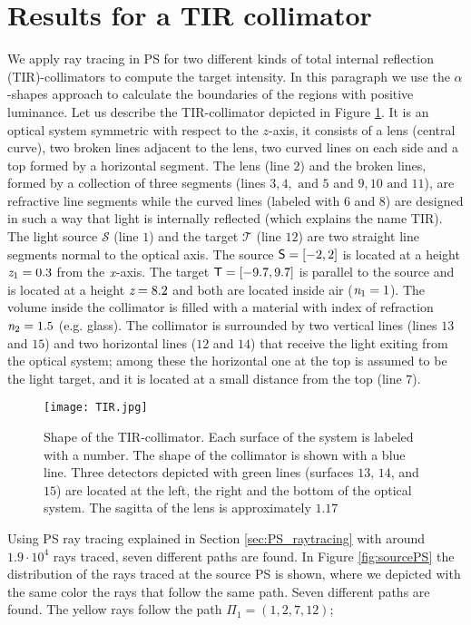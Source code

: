 \section{Results for a TIR collimator}
We apply ray tracing in PS for two different kinds of total internal reflection (TIR)-collimators to compute the target intensity. 
In this paragraph we use the $\alpha$-shapes approach to calculate the boundaries of the regions with positive luminance. Let us describe the TIR-collimator depicted in Figure \ref{fig:tir}. It is an optical system symmetric with respect to the $z$-axis, it consists of a lens (central curve), two broken lines adjacent to the lens,
two curved lines on each side and a top formed by a horizontal segment. The lens (line $2$) and the broken lines, formed by a collection of three segments (lines $3, 4, \mbox{ and } 5$ and $9, 10 \mbox{ and } 11$), are refractive line segments while the curved lines (labeled with $6$ and $8$) are designed in such a way that light is internally reflected (which explains the name TIR).
The light source $\mathcal{S}$ (line $1$) and the target $\mathcal{T}$ (line $12$) are two straight line segments normal to the optical axis.
The source $\textsf{S}= [-2,2]$ is located at a height $\textit{z}_{1} = 0.3$ from the $\textit{x}$-axis.
 The target $\textsf{T}= [-9.7, 9.7]$ is parallel to the source and is located at a height $ \textit{z}= 8.2$ and both are located inside air ($\textit{n}_1=1$).
The volume inside the collimator is filled with a material with index of refraction $\textit{n}_2=1.5$ (e.g. glass).
The collimator is surrounded by two vertical lines (lines $13$ and $15$) and two horizontal lines ($12$ and $14$) that receive the light exiting from the optical system; among these the horizontal one at the top is assumed to be the light target, and it is located at a small distance from the top (line $7$). 
\begin{figure}[h]
  \begin{center}
  \texttt{[image: TIR.jpg]}
  \end{center}
  \caption{Shape of the TIR-collimator. Each surface of the system is labeled with a number.
   The shape of the collimator is shown with a blue line.
   Three detectors depicted with green lines (surfaces $13$, $14$, and $15$) are located at the left, the right and the bottom of the optical system.
The sagitta of the lens is approximately $1.17$}
  \label{fig:tir}
\end{figure}
Using PS ray tracing explained in Section \ref{sec:PS_raytracing} with around $1.9 \cdot 10^4$ rays traced, seven different paths are found. In Figure \ref{fig:sourcePS} the distribution of the rays traced at the source PS  is shown, where we depicted with the same color the rays that follow the same path. Seven different paths are found. The yellow rays follow the path $\Pi_1 = (1, 2, 7, 12)$;
